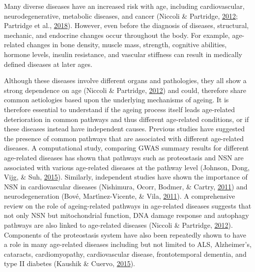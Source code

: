 \documentclass[12pt,twoside]{unicam}
\begin{document}
Many diverse diseases have an increased risk with age, including cardiovascular, neurodegenerative, metabolic diseases, and cancer (Niccoli \& Partridge, \protect\hyperlink{ref-Niccoli2012}{2012}; Partridge et al., \protect\hyperlink{ref-Partridge2018}{2018}). However, even before the diagnosis of diseases, structural, mechanic, and endocrine changes occur throughout the body. For example, age-related changes in bone density, muscle mass, strength, cognitive abilities, hormone levels, insulin resistance, and vascular stiffness can result in medically defined diseases at later ages.

Although these diseases involve different organs and pathologies, they all show a strong dependence on age (Niccoli \& Partridge, \protect\hyperlink{ref-Niccoli2012}{2012}) and could, therefore share common aetiologies based upon the underlying mechanisms of ageing. It is therefore essential to understand if the ageing process itself leads age-related deterioration in common pathways and thus different age-related conditions, or if these diseases instead have independent causes. Previous studies have suggested the presence of common pathways that are associated with different age-related diseases. A computational study, comparing GWAS summary results for different age-related diseases has shown that pathways such as proteostasis and NSN are associated with various age-related diseases at the pathway level (Johnson, Dong, Vijg, \& Suh, \protect\hyperlink{ref-Johnson2015}{2015}). Similarly, independent studies have shown the importance of NSN in cardiovascular diseases (Nishimura, Ocorr, Bodmer, \& Cartry, \protect\hyperlink{ref-Nishimura2011}{2011}) and neurodegeneration (Bové, Martı́nez-Vicente, \& Vila, \protect\hyperlink{ref-Bove2011}{2011}). A comprehensive review on the role of ageing-related pathways in age-related diseases suggests that not only NSN but mitochondrial function, DNA damage response and autophagy pathways are also linked to age-related diseases (Niccoli \& Partridge, \protect\hyperlink{ref-Niccoli2012}{2012}). Components of the proteostasis system have also been repeatedly shown to have a role in many age-related diseases including but not limited to ALS, Alzheimer's, cataracts, cardiomyopathy, cardiovascular disease, frontotemporal dementia, and type II diabetes (Kaushik \& Cuervo, \protect\hyperlink{ref-Kaushik2015}{2015}).
\end{document}
